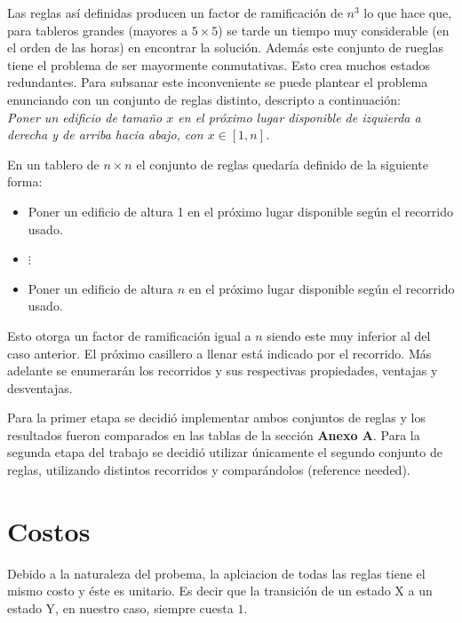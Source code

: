 \documentclass[%
    final,
    reprint,
    notitlepage,
    narroweqnarray,
    inline,
    twoside,
    invited
    ]{ieee}
\begin{document}
\par Las reglas así definidas producen un factor de ramificación de $n^3$ lo que hace que, para tableros grandes (mayores a $5\times5$) se 
tarde un tiempo muy considerable (en el orden de las horas) en encontrar la solución. Además este conjunto de rueglas tiene el problema 
de ser mayormente conmutativas. Esto crea muchos estados redundantes. 
Para subsanar este inconveniente se puede plantear el problema enunciando con un conjunto de reglas distinto, descripto a continuación:\\

\emph{Poner un edificio de tamaño $x$ en el próximo lugar disponible de izquierda a derecha y de arriba hacia abajo, con $x \in [1, n]$.}\\

\par En un tablero de $n\times n$ el conjunto de reglas quedaría definido de la siguiente forma:\\

\begin{itemize}
\item Poner un edificio de altura 1 en el próximo lugar disponible según el recorrido usado.
\item $\vdots$
\item Poner un edificio de altura $n$ en el próximo lugar disponible según el recorrido usado.
\end{itemize}

\par Esto otorga un factor de ramificación igual a $n$ siendo este muy inferior al del caso anterior. El próximo casillero a llenar está indicado por 
el recorrido. Más adelante se enumerarán los recorridos y sus respectivas propiedades, ventajas y desventajas. \\
\par Para la primer etapa se decidió implementar ambos conjuntos de reglas y los resultados fueron comparados en las tablas de la sección \textbf{Anexo A}. 
Para la segunda etapa del trabajo se decidió utilizar únicamente el segundo conjunto de reglas, utilizando distintos recorridos y comparándolos (reference needed). 

\section{Costos}

\par Debido a la naturaleza del probema, la aplciacion de todas las reglas tiene el mismo costo y éste es unitario. Es decir que la transición de un estado X a un estado Y, en nuestro caso, siempre cuesta $1$.
\end{document}
